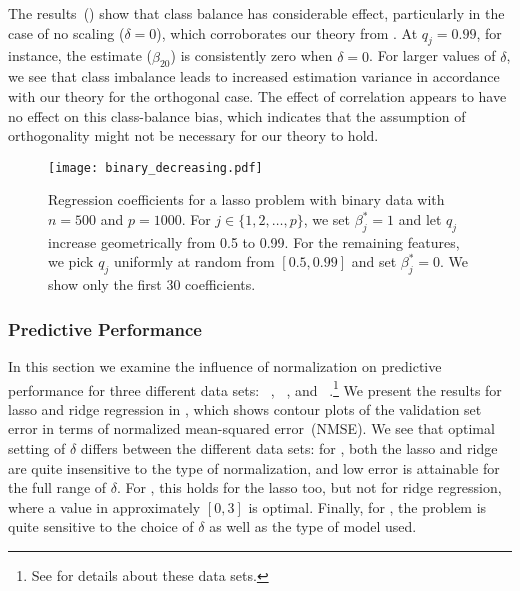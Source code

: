 The results~() show that class balance has considerable effect,
particularly in the case of no scaling (\(\delta = 0\)), which corroborates our theory from
. At \(q_j=0.99\), for instance, the estimate
(\(\hat{\beta}_{20}\)) is consistently zero when \(\delta = 0\). For larger values of
\(\delta\), we see that class imbalance leads to increased estimation variance in
accordance with our theory for the orthogonal case. The effect of correlation appears to
have no effect on this class-balance bias, which indicates that the assumption of
orthogonality might not be necessary for our theory to hold.

\begin{figure}[htpb]
  \centering
  \texttt{[image: binary\_decreasing.pdf]}
  \caption{%
    Regression coefficients for a lasso problem with binary data with \(n = 500\) and \(p =
    \num{1000}\). For \(j \in \{1,2,\dots,p\}\), we set \(\beta_j^* = 1\) and
    let \(q_j\) increase geometrically from 0.5 to 0.99. For the remaining features,
    we pick \(q_j\) uniformly at random from \([0.5, 0.99]\) and
    set \(\beta_j^* = 0\). We show only the first 30 coefficients.
  }
  \label{fig:binary-decreasing}
\end{figure}

\subsubsection{Predictive Performance}
\label{sec:experiments-predictive-performance}

In this section we examine the influence of normalization on predictive performance for
three different data sets: ~\citep{rhee2006},
~\citep{chen2004}, and
~\citep{hirst1994,king1995}.\footnote{See  for
  details about these data sets.} We present the results for lasso and ridge regression in
, which shows contour plots of the validation set error in
terms of normalized mean-squared error~(NMSE). We see that optimal setting of \(\delta\)
differs between the different data sets: for , both the lasso and ridge
are quite insensitive to the type of normalization, and low error is attainable for the
full range of \(\delta\). For , this holds for the lasso too, but not for
ridge regression, where a value in approximately \([0,3]\) is optimal. Finally, for
, the problem is quite sensitive to the choice of \(\delta\) as well as the
type of model used.

